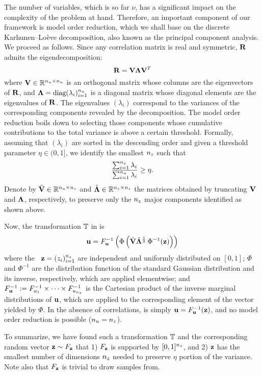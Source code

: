 The number of variables, which is so far $\nu$, has a significant impact on the
complexity of the problem at hand. Therefore, an important component of our
framework is model order reduction, which we shall base on the discrete
Karhunen--Lo\`{e}ve decomposition, also known as the principal component
analysis. We proceed as follows. Since any correlation matrix is real and
symmetric, $\mathbf{R}$ admits the eigendecomposition:
\[
  \mathbf{R} = \mathbf{V} \mathbf{\Lambda} \mathbf{V}^T
\]
where $\mathbf{V} \in \mathbb{R}^{{n_u} \times {n_u}}$ is an orthogonal matrix whose columns
are the eigenvectors of $\mathbf{R}$, and $\mathbf{\Lambda} = \text{diag}(\lambda_i)_{i =
1}^{n_u}$ is a diagonal matrix whose diagonal elements are the eigenvalues of
$\mathbf{R}$. The eigenvalues $(\lambda_i)$ correspond to the variances of the
corresponding components revealed by the decomposition. The model order
reduction boils down to selecting those components whose cumulative
contributions to the total variance is above a certain threshold. Formally,
assuming that $(\lambda_i)$ are sorted in the descending order and given a
threshold parameter $\eta \in (0, 1]$, we identify the smallest ${n_z}$ such that
\[
  \frac{\sum_{i = 1}^{n_z} \lambda_i}{\sum_{i = 1}^{n_u} \lambda_i} \geq \eta.
\]
Denote by $\tilde{\mathbf{V}} \in \mathbb{R}^{{n_u} \times {n_z}}$ and $\tilde{\mathbf{\Lambda}}
\in\mathbb{R}^{{n_z} \times {n_z}}$ the matrices obtained by truncating $\mathbf{V}$ and
$\mathbf{\Lambda}$, respectively, to preserve only the ${n_z}$ major components
identified as shown above.

Now, the transformation $\mathbb{T}$ in  is
\begin{equation} \elab{transformation}
  \vu = \distribution_\vu^{-1} \left( \Phi\left( \tilde{\m{V}} \tilde{\m{\Lambda}}^\frac{1}{2} \, \Phi^{-1}(\vz) \right) \right)
\end{equation}
where the \rvs\ $\mathbf{z} = (z_i)_{i = 1}^{n_z}$ are independent and uniformly
distributed on $[0, 1]$; $\Phi$ and $\Phi^{-1}$ are the distribution function of
the standard Gaussian distribution and its inverse, respectively, which are
applied elementwise; and $F_{\mathbf{u}}^{-1} := F_{u_1}^{-1}
\times \cdots \times F_{u_{n_z}}^{-1}$ is the Cartesian product of
the inverse marginal distributions of $\mathbf{u}$, which are applied to the
corresponding element of the vector yielded by $\Phi$. In the absence of
correlations,  is simply $\mathbf{u} =
F_{\mathbf{u}}^{-1}(\mathbf{z})$, and no model order reduction is possible (${n_u} =
{n_z}$).

To summarize, we have found such a transformation $\mathbb{T}$ and the
corresponding random vector $\mathbf{z} \sim F_{\mathbf{z}}$ that 1)
$F_{\mathbf{z}}$ is supported by $[0, 1]^{n_z}$, and 2) $\mathbf{z}$ has the smallest
number of dimensions ${n_z}$ needed to preserve $\eta$ portion of the variance.
Note also that $F_{\mathbf{z}}$ is trivial to draw samples from.
